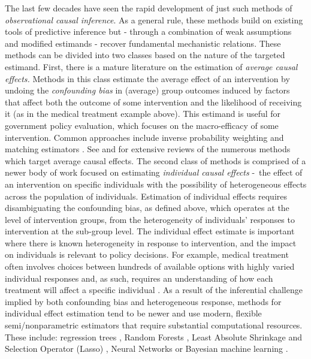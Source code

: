 \documentclass[../main.tex]{subfiles}
\begin{document}
\vspace{\baselineskip}
The last few decades have seen the rapid development of just such methods of \textit{observational causal inference}. As a general rule, these methods build on existing tools of predictive inference but - through a combination of weak assumptions and modified estimands - recover fundamental mechanistic relations. These methods can be divided into two classes based on the nature of the targeted estimand. First, there is a mature literature on the estimation of \textit{average causal effects. }Methods in this class estimate the average effect of an intervention by undoing the \textit{confounding bias} in (average) group outcomes induced by factors that affect both the outcome of some intervention and the likelihood of receiving it (as in the medical treatment example above). This estimand is useful for government policy evaluation, which focuses on the macro-efficacy of some intervention. Common approaches include inverse probability weighting \parencite{Horvitz1952AUniverse, Hirano2003EfficientScore} and matching estimators \parencite{Rubin1974EstimatingStudies, Rosenbaum1983TheEffects}. See \textcite{Imbens2009RecentEvaluation} and \textcite{Athey2017TheEvaluation} for extensive reviews of the numerous methods which target average causal effects. The second class of methods is comprised of a newer body of work focused on estimating \textit{individual causal effects }-\ the effect of an intervention on specific individuals with the possibility of heterogeneous effects across the population of individuals. Estimation of individual effects requires disambiguating the confounding bias, as defined above, which operates at the level of intervention groups, from the heterogeneity of individuals’ responses to intervention at the sub-group level. The individual effect estimate is important where there is known heterogeneity in response to intervention, and the impact on individuals is relevant to policy decisions. For example, medical treatment often involves choices between hundreds of available options with highly varied individual responses and, as such, requires an understanding of how each treatment will affect a specific individual \parencite{Lu2018EstimatingMethods}. As a result of the inferential challenge implied by both confounding bias and heterogeneous response, methods for individual effect estimation tend to be newer and use modern, flexible semi/nonparametric estimators that require substantial computational resources. These include: regression trees \parencite{Su2009SubgroupTsai, Athey2016RecursiveEffects}, Random Forests \parencite{Wager2018EstimationForests, Athey2019GeneralizedForests}, Least Absolute Shrinkage and Selection Operator (Lasso) \parencite{Qian2011PerformanceRules, Tian2014ACovariates, Chen2017AScoring}, Neural Networks  \parencite{Johansson2016LearningInference, Johansson2018LearningDesigns, Schwab2018PerfectNetworks, Li2017MatchingEstimation, Kunzel2018TransferNetworks} or Bayesian machine learning \parencite{Hill2011BayesianInference, Taddy2016AExperimentation}.
\end{document}
